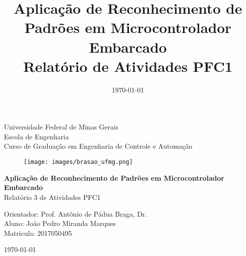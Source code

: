 \begin{titlepage}
    \begin{center}
           
    {\large Universidade Federal de Minas Gerais\\
    Escola de Engenharia \\
    Curso de Graduação em Engenharia de Controle e Automação\\}
    \vfill

    \begin{figure}[h]
        \centering
        \texttt{[image: images/brasao\_ufmg.png]}
    \end{figure}
    \vspace{2cm}


    {\bf\Large Aplicação de Reconhecimento de Padrões em Microcontrolador Embarcado\\}
    \vspace{1cm} 
    {\Large Relatório 3 de Atividades PFC1}
    \vspace{2cm}  
    
    {\large Orientador: Prof. Antônio de Pádua Braga, Dr.}\\

    
    {\large Aluno: João Pedro Miranda Marques \\
    Matricula: 2017050495}
    \vspace{2cm}  

    \today
    \vspace{2cm}  
       

    \large \date{\today}
    \end{center}
    
    \end{titlepage}
    
    \newpage
    \clearpage
    \thispagestyle{empty}
    
    \cleardoublepage


\title{
    Aplicação de  Reconhecimento de Padrões em Microcontrolador Embarcado \\
    \large Relatório de Atividades PFC1}

